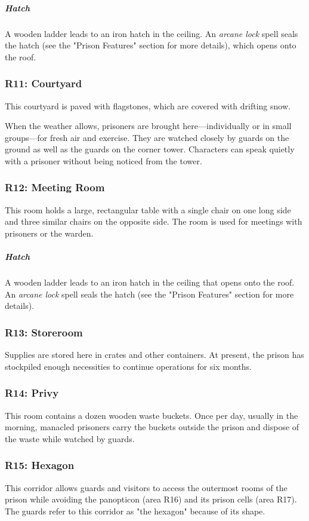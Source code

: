 \documentclass[10pt,a4paper,twoside,bg=print,twocolumn,openany,nodeprecatedcode]{dndbook}
\begin{document}
\subparagraph{Hatch}
A wooden ladder leads to an iron hatch in the ceiling. An \textit{arcane lock} spell seals the hatch (see the "Prison Features" section for more details), which opens onto the roof.

\subsubsection{R11: Courtyard}
This courtyard is paved with flagstones, which are covered with drifting snow.

When the weather allows, prisoners are brought here—individually or in small groups—for fresh air and exercise. They are watched closely by guards on the ground as well as the guards on the corner tower. Characters can speak quietly with a prisoner without being noticed from the tower.

\subsubsection{R12: Meeting Room}
This room holds a large, rectangular table with a single chair on one long side and three similar chairs on the opposite side. The room is used for meetings with prisoners or the warden.

\subparagraph{Hatch}
A wooden ladder leads to an iron hatch in the ceiling that opens onto the roof. An \textit{arcane lock} spell seals the hatch (see the "Prison Features" section for more details).

\subsubsection{R13: Storeroom}
Supplies are stored here in crates and other containers. At present, the prison has stockpiled enough necessities to continue operations for six months.

\subsubsection{R14: Privy}
This room contains a dozen wooden waste buckets. Once per day, usually in the morning, manacled prisoners carry the buckets outside the prison and dispose of the waste while watched by guards.

\subsubsection{R15: Hexagon}
This corridor allows guards and visitors to access the outermost rooms of the prison while avoiding the panopticon (area R16) and its prison cells (area R17). The guards refer to this corridor as "the hexagon" because of its shape.
\end{document}
